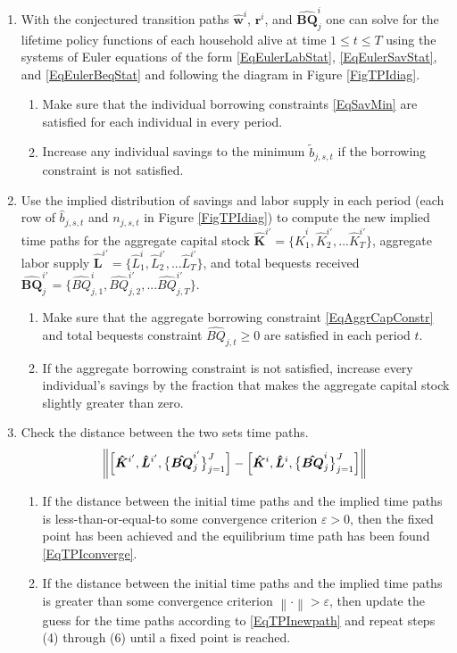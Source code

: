 \documentclass[letterpaper,12pt]{article}
\theoremstyle{definition}
\newcommand\ve{\varepsilon}
\newcommand\norm[1]{\left\lVert#1\right\rVert}
\begin{document}
\begin{enumerate}
\begin{enumerate}
      \end{enumerate}
    \item With the conjectured transition paths $\bm{\hat{w}}^i$, $\bm{r}^i$, and $\bm{\hat{BQ}}_j^i$ one can solve for the lifetime policy functions of each household alive at time $1\leq t\leq T$ using the systems of Euler equations of the form \eqref{EqEulerLabStat}, \eqref{EqEulerSavStat}, and \eqref{EqEulerBeqStat} and following the diagram in Figure \ref{FigTPIdiag}.
      \begin{enumerate}
        \item Make sure that the individual borrowing constraints \eqref{EqSavMin} are satisfied for each individual in every period.
        \item Increase any individual savings to the minimum $\tilde{b}_{j,s,t}$ if the borrowing constraint is not satisfied.
      \end{enumerate}
    \item Use the implied distribution of savings and labor supply in each period (each row of $\hat{b}_{j,s,t}$ and $n_{j,s,t}$ in Figure \ref{FigTPIdiag}) to compute the new implied time paths for the aggregate capital stock $\bm{\hat{K}}^{i'} = \{\hat{K}_1^i,\hat{K}_2^{i'},...\hat{K}_T^{i'}\}$, aggregate labor supply $\bm{\hat{L}}^{i'} = \{\hat{L}_1^i,\hat{L}_2^{i'},...\hat{L}_T^{i'}\}$, and total bequests received $\bm{\hat{BQ}}_j^{i'} = \{\hat{BQ}_{j,1}^i,\hat{BQ}_{j,2}^{i'},...\hat{BQ}_{j,T}^{i'}\}$.
      \begin{enumerate}
        \item Make sure that the aggregate borrowing constraint \eqref{EqAggrCapConstr} and total bequests constraint $\hat{BQ}_{j,t}\geq 0$ are satisfied in each period $t$.
        \item If the aggregate borrowing constraint is not satisfied, increase every individual's savings by the fraction that makes the aggregate capital stock slightly greater than zero.
      \end{enumerate}
    \item Check the distance between the two sets time paths.
      \begin{equation*}
        \norm{\Bigl[\bm{\hat{K}}^{i'}, \bm{\hat{L}}^{i'},\bigl\{\bm{\hat{BQ}}_j^{i'}\bigr\}_{j=1}^J\Bigr] - \Bigl[\bm{\hat{K}}^{i},\bm{\hat{L}}^{i},\bigl\{\bm{\hat{BQ}}_j^{i}\bigr\}_{j=1}^J\Bigr]}
      \end{equation*}
      \begin{enumerate}
        \item If the distance between the initial time paths and the implied time paths is less-than-or-equal-to some convergence criterion $\ve>0$, then the fixed point has been achieved and the equilibrium time path has been found \eqref{EqTPIconverge}.
        \item If the distance between the initial time paths and the implied time paths is greater than some convergence criterion $\norm{\cdot}>\ve$, then update the guess for the time paths according to \eqref{EqTPInewpath} and repeat steps (4) through (6) until a fixed point is reached.
      \end{enumerate}
  \end{enumerate}
\end{document}
